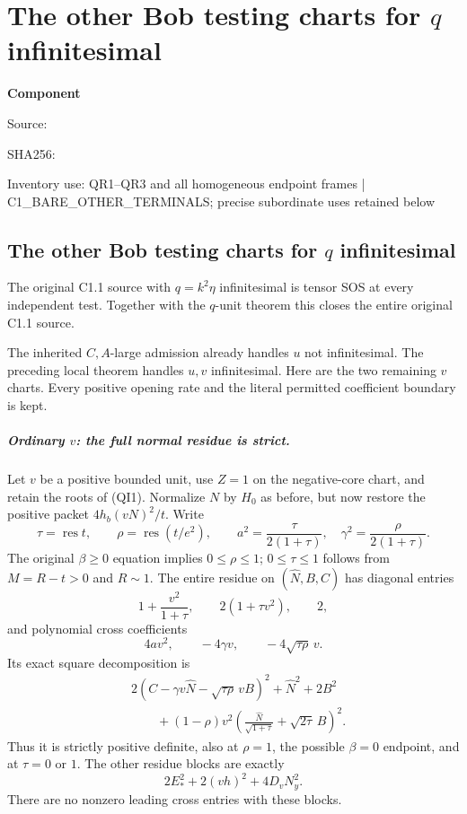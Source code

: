 \chapter{The other Bob testing charts for $q$ infinitesimal}
\label{component:pd2ecc6ac1891}
\noindent\textbf{Component }\par
{\small\noindent Source: \par}
{\small\noindent SHA256: \par}
{\small\noindent Inventory use: QR1--QR3 and all homogeneous endpoint frames | C1\_\allowbreak{}BARE\_\allowbreak{}OTHER\_\allowbreak{}TERMINALS; precise subordinate uses retained below\par}
\medskip
\section{The other Bob testing charts for $q$ infinitesimal}
\label{pd2ecc6ac1891:sec:r7-c1-q-inf-remote}
\begin{theorem}
The original C1.1 source with $q=k^2\eta$ infinitesimal is tensor SOS
at every independent test. Together with the $q$-unit theorem this
closes the entire original C1.1 source.
\end{theorem}
The inherited $C,A$-large admission already handles $u$ not
infinitesimal. The preceding local theorem handles $u,v$
infinitesimal. Here are the two remaining $v$ charts. Every positive
opening rate and the literal permitted coefficient boundary is kept.

\paragraph{Ordinary $v$: the full normal residue is strict.}
Let $v$ be a positive bounded unit, use $Z=1$ on the negative-core
chart, and retain the roots of (QI1). Normalize $N$ by $H_0$ as
before, but now restore the positive packet $4h_b(vN)^2/t$.
Write
\[
 \tau=\operatorname{res}t,\qquad
 \rho=\operatorname{res}(t/e^2),\qquad
 a^2=\frac{\tau}{2(1+\tau)},\quad
 \gamma^2=\frac{\rho}{2(1+\tau)}.
\]
The original $\beta\ge0$ equation implies $0\le\rho\le1$;
$0\le\tau\le1$ follows from $M=R-t>0$ and $R\sim1$.
The entire residue on $(\widehat N,B,C)$ has diagonal entries
\[
 1+\frac{v^2}{1+\tau},\qquad 2(1+\tau v^2),\qquad 2,
\]
and polynomial cross coefficients
\[
 4av^2,\qquad -4\gamma v,\qquad -4\sqrt{\tau\rho}\,v.
\]
Its exact square decomposition is
\begin{align*}
 &2(C-\gamma v\widehat N-\sqrt{\tau\rho}\,vB)^2
       +\widehat N^2+2B^2\\
 &\qquad +(1-\rho)v^2
    \left(\frac{\widehat N}{\sqrt{1+\tau}}+
                         \sqrt{2\tau}\,B\right)^2.
 \tag{QR1}
\end{align*}
Thus it is strictly positive definite, also at $\rho=1$, the
possible $\beta=0$ endpoint, and at $\tau=0$ or $1$.
The other residue blocks are exactly
\[
                       2E_*^2+2(vh)^2+4D_vN_y^2.
\]
There are no nonzero leading cross entries with these blocks.

